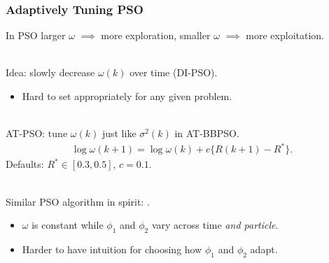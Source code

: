 \documentclass[xcolor=dvipsnames]{beamer}
\begin{document}
\begin{frame}
\frametitle{Adaptively Tuning PSO}
In PSO larger $\omega$ $\implies$ more exploration, smaller $\omega$ $\implies$ more exploitation.\\~\\

\pause

Idea: slowly decrease $\omega(k)$ over time \citep{eberhart2000comparing} (DI-PSO).\\
\begin{itemize}
\item Hard to set appropriately for any given problem.\\~\\
\end{itemize}

\pause

 AT-PSO: tune $\omega(k)$ just like $\sigma^2(k)$ in AT-BBPSO.
\begin{align*}
\log\omega(k+1) = \log\omega(k) + c\{R(k+1) - R^*\}.
\end{align*}
\pause
Defaults: $R^*\in[0.3, 0.5]$, $c = 0.1$.\\~\\

\pause

Similar PSO algorithm in spirit: \cite{zhang2003adaptive}.
\begin{itemize} 
\item $\omega$ is constant while $\phi_1$ and $\phi_2$ vary across time {\color{red}\emph{and particle}}. 
\item Harder to have intuition for choosing how $\phi_1$ and $\phi_2$ adapt.
\end{itemize}
\end{frame}
\end{document}

